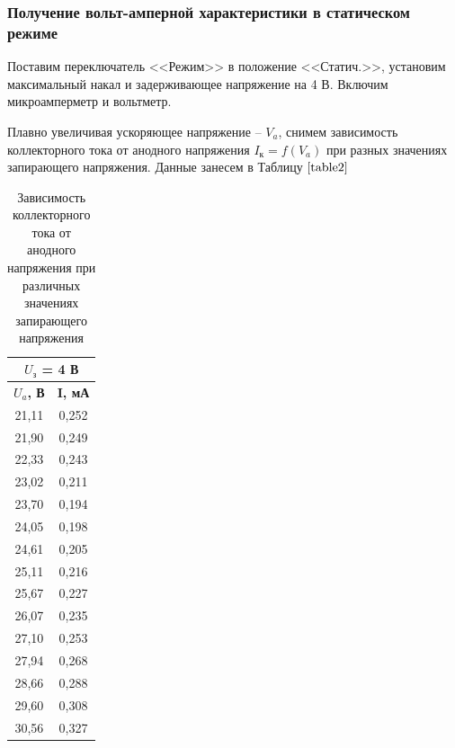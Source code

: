 \documentclass[a4paper,12pt]{article}
\begin{document}
\subsubsection*{Получение вольт-амперной характеристики в статическом режиме}

Поставим переключатель <<Режим>> в положение <<Статич.>>, установим максимальный накал и задерживающее напряжение на 4 В. Включим микроамперметр и вольтметр.

Плавно увеличивая ускоряющее напряжение -- $V_a$, снимем зависимость коллекторного тока от анодного напряжения $I_к = f(V_a)$ при разных значениях запирающего напряжения. Данные занесем в Таблицу $\ref{table2}$

\newpage

\begin{table}[h]
\centering
\caption{Зависимость коллекторного тока от анодного напряжения при различных  \\ значениях запирающего напряжения}
\label{table2}
\begin{minipage}{0.3\textwidth}
	\begin{tabular}{|cc|}
	\hline
	\multicolumn{2}{|c|}{\textbf{$U_з$   = 4 В}} \\ \hline
	\multicolumn{1}{|c|}{\textbf{$U_a$, В}} & \textbf{I, мА} \\ \hline
	\multicolumn{1}{|c|}{21,11} & 0,252 \\ \hline
	\multicolumn{1}{|c|}{21,90} & 0,249 \\ \hline
	\multicolumn{1}{|c|}{22,33} & 0,243 \\ \hline
	\multicolumn{1}{|c|}{23,02} & 0,211 \\ \hline
	\multicolumn{1}{|c|}{23,70} & 0,194 \\ \hline
	\multicolumn{1}{|c|}{24,05} & 0,198 \\ \hline
	\multicolumn{1}{|c|}{24,61} & 0,205 \\ \hline
	\multicolumn{1}{|c|}{25,11} & 0,216 \\ \hline
	\multicolumn{1}{|c|}{25,67} & 0,227 \\ \hline
	\multicolumn{1}{|c|}{26,07} & 0,235 \\ \hline
	\multicolumn{1}{|c|}{27,10} & 0,253 \\ \hline
	\multicolumn{1}{|c|}{27,94} & 0,268 \\ \hline
	\multicolumn{1}{|c|}{28,66} & 0,288 \\ \hline
	\multicolumn{1}{|c|}{29,60} & 0,308 \\ \hline
	\multicolumn{1}{|c|}{30,56} & 0,327 \\ \hline

\end{tabular}
\end{minipage}
\end{table}
\end{document}

